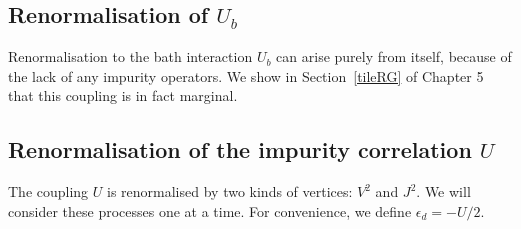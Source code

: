 \subsection{Renormalisation of \(U_b\)}
Renormalisation to the bath interaction \(U_b\) can arise purely from itself, because of the lack of any impurity operators. We show in Section~\ref{tileRG} of Chapter 5 that this coupling is in fact marginal. 

\subsection{Renormalisation of the impurity correlation \(U\)}
The coupling \(U\) is renormalised by two kinds of vertices: \(V^2\) and \(J^2\). We will consider these processes one at a time. For convenience, we define \(\epsilon_d = -U/2\).

